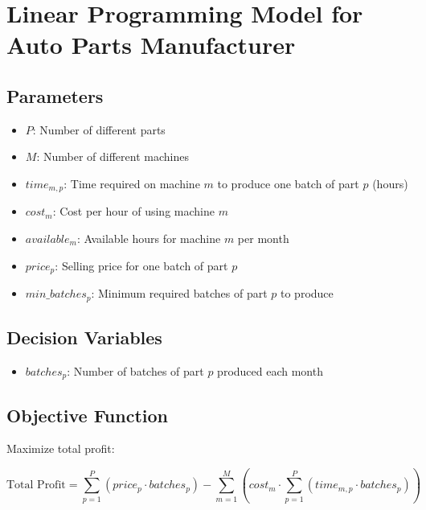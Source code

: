 \documentclass{article}
\begin{document}
\section*{Linear Programming Model for Auto Parts Manufacturer}

\subsection*{Parameters}
\begin{itemize}
    \item $P$: Number of different parts
    \item $M$: Number of different machines
    \item $time_{m,p}$: Time required on machine $m$ to produce one batch of part $p$ (hours)
    \item $cost_{m}$: Cost per hour of using machine $m$
    \item $available_{m}$: Available hours for machine $m$ per month
    \item $price_{p}$: Selling price for one batch of part $p$
    \item $min\_batches_{p}$: Minimum required batches of part $p$ to produce
\end{itemize}

\subsection*{Decision Variables}
\begin{itemize}
    \item $batches_{p}$: Number of batches of part $p$ produced each month
\end{itemize}

\subsection*{Objective Function}
Maximize total profit:

\begin{equation}
    \text{Total Profit} = \sum_{p=1}^{P} (price_{p} \cdot batches_{p}) - \sum_{m=1}^{M} \left( cost_{m} \cdot \sum_{p=1}^{P} (time_{m,p} \cdot batches_{p}) \right)
\end{equation}
\end{document}
